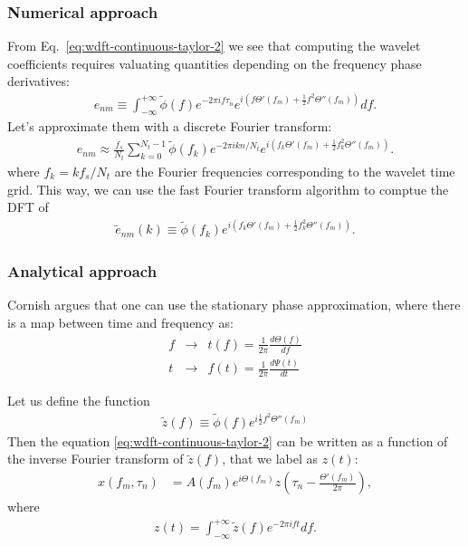 \documentclass{article}
\begin{document}
\subsubsection{Numerical approach}

From Eq.~\eqref{eq:wdft-continuous-taylor-2} we see that computing the wavelet coefficients requires valuating quantities depending on the frequency phase derivatives:
\begin{eqnarray}
\label{eq:definition_enm}
e_{nm} \equiv \int_{-\infty}^{+\infty} \tilde{\phi}(f)  e^{-2\pi i f \tau_n} e^{i \left(f \Theta'(f_m) + \frac{1}{2} f^2 \Theta''(f_m)\right)} df.
\end{eqnarray}
Let's approximate them with a discrete Fourier transform:
\begin{eqnarray}
e_{nm} \approx \frac{f_s}{N_t}\sum_{k=0}^{N_t-1} \tilde{\phi}(f_k)  e^{-2\pi i k n / N_t} e^{i \left(f_k \Theta'(f_m) + \frac{1}{2} f_k^2 \Theta''(f_m)\right)}.
\end{eqnarray}
where $f_k = k f_s / N_t$ are the Fourier frequencies corresponding to the wavelet time grid.
This way, we can use the fast Fourier transform algorithm to comptue the DFT of 
\begin{eqnarray}
    \tilde{e}_{nm}(k) \equiv \tilde{\phi}(f_k) e^{i \left(f_k \Theta'(f_m) + \frac{1}{2} f_k^2 \Theta''(f_m)\right)}.
\end{eqnarray}


\subsubsection{Analytical approach}

Cornish argues that one can use the stationary phase approximation, where there is a map between time and frequency as:
\begin{eqnarray}
    f & \longrightarrow & t(f) = \frac{1}{2 \pi} \frac{d\Theta(f)}{df} \\
    t & \longrightarrow & f(t) = \frac{1}{2 \pi} \frac{d\Psi(t)}{dt} 
\end{eqnarray}


Let us define the function
\begin{eqnarray}
    \tilde{z}(f) \equiv \tilde{\phi}(f) e^{i\frac{1}{2} f^2 \Theta''(f_m)}
\end{eqnarray}
Then the equation \eqref{eq:wdft-continuous-taylor-2} can be written as a function of the inverse Fourier transform of $\tilde{z}(f)$, that we label as $z(t)$:
\begin{align}
\label{eq:wdft-continuous-taylor-3}
    x(f_m, \tau_n) & = A(f_m) e^{i\Theta(f_m)} z\left(\tau_n - \frac{\Theta'(f_m)}{2 \pi} \right),
\end{align}
where
\begin{eqnarray}
\label{eq:z_inverse_fourier}
    z(t) = \int_{-\infty}^{+\infty}\tilde{z}(f) e^{-2\pi i f t} df.
\end{eqnarray}
\end{document}

